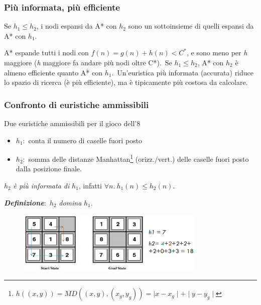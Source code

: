 \subsubsection{Più informata, più efficiente}

\begin{theorem}
	Se $h_1 \leq h_2$, i nodi espansi da A* con $h_2$ sono un sottoinsieme di quelli espansi da A* con $h_1$.
\end{theorem}

\noindent A* espande tutti i nodi con $f(n)= g(n)+h(n) <C^*$, e sono meno per \textit{h} maggiore (\textit{h} maggiore fa andare più nodi oltre C*).\
Se $h_1 \leq h_2$, A* con $h_2$
è almeno efficiente quanto A* con $h_1$.\
Un'euristica più informata (accurata) riduce lo spazio di ricerca (è più efficiente), ma è tipicamente più costosa da calcolare.

\subsubsection{Confronto di euristiche ammissibili}

Due euristiche ammissibili per il gioco dell'8
\begin{itemize}
	\item $h_1$:\ conta il numero di caselle fuori posto
	\item $h_2$:\ somma delle distanze Manhattan\footnote{$h((x,y)) = MD((x, y), (x_g , y_g)) = \mid x - x_g \mid + \mid y - y_g\mid$} (orizz./vert.) delle caselle fuori posto dalla posizione finale.
\end{itemize}
$h_2$ \textit{è più informata di} $h_1$, infatti $\forall n.\ h_1(n) \leq h_2 (n)$.

\noindent\textbf{\textit{Definizione}}:\ $h_2$ \textit{domina} $h_1$.

\begin{figure}[H]
	\centering
	\includegraphics[width=0.8\textwidth]{immagini/otto_manhattan.png}
\end{figure}

